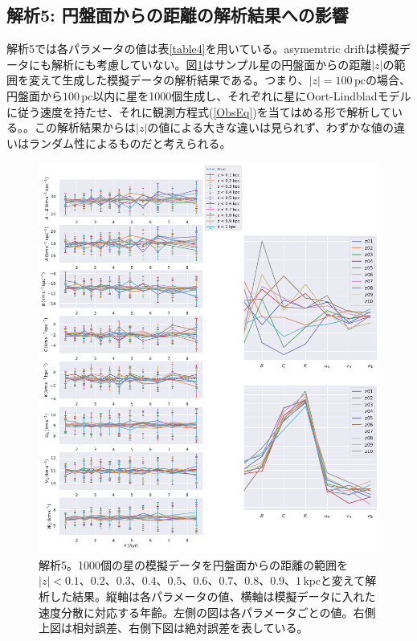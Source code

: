 \subsection{解析5: 円盤面からの距離の解析結果への影響}
解析5では各パラメータの値は表\ref{table4}を用いている。asymemtric driftは模擬データにも解析にも考慮していない。図\ref{fig:Mock_z}はサンプル星の円盤面からの距離$|z|$の範囲を変えて生成した模擬データの解析結果である。つまり、$|z|=100\,\mathrm{pc}$の場合、円盤面から$100\,\mathrm{pc}$以内に星を1000個生成し、それぞれに星にOort-Lindbladモデルに従う速度を持たせ、それに観測方程式(\ref{ObsEq})を当てはめる形で解析している。。この解析結果からは$|z|$の値による大きな違いは見られず、わずかな値の違いはランダム性によるものだと考えられる。

\begin{figure}[htbp]
	\centering
	\includegraphics[width=15cm]{fig/Mock_z.pdf}
	\caption{解析5。1000個の星の模擬データを円盤面からの距離の範囲を$|z|<0.1、0.2、0.3、0.4、0.5、0.6、0.7、0.8、0.9、1\,\mathrm{kpc}$と変えて解析した結果。縦軸は各パラメータの値、横軸は模擬データに入れた速度分散に対応する年齢。左側の図は各パラメータごとの値。右側上図は相対誤差、右側下図は絶対誤差を表している。} \label{fig:Mock_z}
\end{figure}

